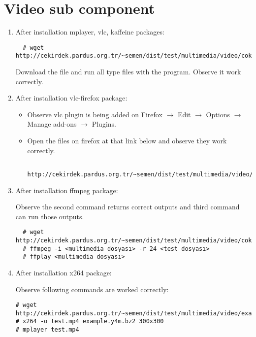 \documentclass[a4paper,10pt]{article}
\begin{document}
\section{Video sub component}
\begin{enumerate}
 \item After installation mplayer, vlc, kaffeine packages:
 \begin{verbatim}
  # wget http://cekirdek.pardus.org.tr/~semen/dist/test/multimedia/video/cokluortam.tar
 \end{verbatim}
Download the file and run all type files with the program. Observe it work correctly.

 \item After installation vlc-firefox package:
 \begin{itemize}
  \item Observe vlc plugin is being added on Firefox $\rightarrow$ Edit $\rightarrow$ Options $\rightarrow$ Manage add-ons $\rightarrow$ Plugins.
  \item Open the files on firefox at that link below and observe they work correctly.
  \begin{verbatim}
  http://cekirdek.pardus.org.tr/~semen/dist/test/multimedia/video/cokluortam/  
  \end{verbatim}
 \end{itemize}
\item After installation ffmpeg package:
 
Observe the second command returns correct outputs and third command can run those outputs.
\begin{verbatim}
  # wget http://cekirdek.pardus.org.tr/~semen/dist/test/multimedia/video/cokluortam.tar 
  # ffmpeg -i <multimedia dosyası> -r 24 <test dosyası>
  # ffplay <multimedia dosyası>
  \end{verbatim}
\item After installation x264 package:

Observe following commands are worked correctly:
\begin{verbatim}
# wget  http://cekirdek.pardus.org.tr/~semen/dist/test/multimedia/video/example.y4m.bz2
# x264 -o test.mp4 example.y4m.bz2 300x300 
# mplayer test.mp4
\end{verbatim}

\end{enumerate}
\end{document}
